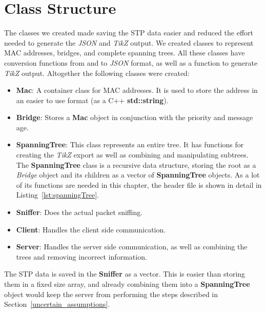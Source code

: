 \section{Class Structure}
\label{data}
The classes we created made saving the STP data easier and reduced the effort needed to generate the \textit{JSON} and \textit{TikZ} output.
We created classes to represent MAC addresses, bridges, and complete spanning trees.
All these classes have conversion functions from and to \textit{JSON} format, as well as a function to generate \textit{TikZ} output.
Altogether the following classes were created:
\begin{itemize}
    \item \textbf{Mac}: A container class for MAC addresses.
        It is used to store the address in an easier to use format (as a C++ \textbf{std::string}).
    \item \textbf{Bridge}: Stores a \textbf{Mac} object in conjunction with the priority and message age.
    \item \textbf{SpanningTree}: This class represents an entire tree.
        It has functions for creating the \textit{TikZ} export as well as combining and manipulating subtrees.
        The \textbf{SpanningTree} class is a recursive data structure, storing the root as a \textit{Bridge} object and its children as a vector of \textbf{SpanningTree} objects.
        As a lot of its functions are needed in this chapter, the header file is shown in detail in Listing~\ref{lst:spanningTree}.
    \item \textbf{Sniffer}: Does the actual packet sniffing.
    \item \textbf{Client}: Handles the client side communication.
    \item \textbf{Server}: Handles the server side communication, as well as combining the trees and removing incorrect information.
\end{itemize}

The STP data is saved in the \textbf{Sniffer} as a vector.
This is easier than storing them in a fixed size array, and already combining them into a \textbf{SpanningTree} object would keep the server from performing the steps described in Section~\ref{uncertain_assumptions}.

